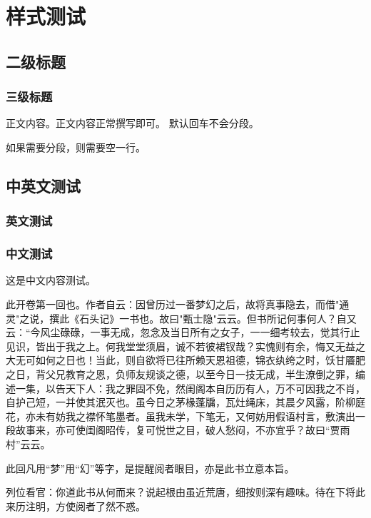 \section{样式测试}
\subsection{二级标题}
\subsubsection{三级标题}
正文内容。正文内容正常撰写即可。
默认回车不会分段。

如果需要分段，则需要空一行。

\subsection{中英文测试}
\subsubsection{英文测试}
\blindtext[2]

\subsubsection{中文测试}
这是中文内容测试。

此开卷第一回也。作者自云：因曾历过一番梦幻之后，故将真事隐去，而借"通灵"之说，撰此《石头记》一书也。故曰"甄士隐"云云。但书所记何事何人？自又云：“今风尘碌碌，一事无成，忽念及当日所有之女子，一一细考较去，觉其行止见识，皆出于我之上。何我堂堂须眉，诚不若彼裙钗哉？实愧则有余，悔又无益之大无可如何之日也！当此，则自欲将已往所赖天恩祖德，锦衣纨绔之时，饫甘餍肥之日，背父兄教育之恩，负师友规谈之德，以至今日一技无成，半生潦倒之罪，编述一集，以告天下人：我之罪固不免，然闺阁本自历历有人，万不可因我之不肖，自护己短，一并使其泯灭也。虽今日之茅椽蓬牖，瓦灶绳床，其晨夕风露，阶柳庭花，亦未有妨我之襟怀笔墨者。虽我未学，下笔无，又何妨用假语村言，敷演出一段故事来，亦可使闺阁昭传，复可悦世之目，破人愁闷，不亦宜乎？故曰“贾雨村”云云。

此回凡用“梦”用“幻”等字，是提醒阅者眼目，亦是此书立意本旨。

列位看官：你道此书从何而来？说起根由虽近荒唐，细按则深有趣味。待在下将此来历注明，方使阅者了然不惑。
